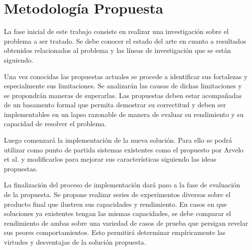 \section{Metodología Propuesta}

La fase inicial de este trabajo consiste en realizar una investigación sobre el
problema a ser tratado. Se debe conocer el estado del arte en cuanto a resultados obtenidos
relacionados al problema y las líneas de investigación que se están siguiendo.

Una vez conocidas las propuestas actuales se procede a identificar sus
fortalezas y especialmente sus limitaciones. Se analizarán las causas de
dichas limitaciones y se propondrán maneras de superarlas. Las propuestas deben
estar acompañadas de un basamento formal que permita demostrar su correctitud y
deben ser implementables en un lapso razonable de manera de evaluar su
rendimiento y su capacidad de resolver el problema.

Luego comenzará la implementación de la nueva solución. Para ello se podrá
utilizar como punto de partida sistemas existentes como el propuesto por Arvelo
et al. \cite{arvelo:aaai06} y modificarlos para mejorar
sus características siguiendo las ideas propuestas.

La finalización del proceso de implementación dará paso a la fase de evaluación de
la propuesta. Se propone realizar series de experimentos diversos sobre el
producto final que ilustren sus capacidades y rendimiento. En casos en
que soluciones ya existentes tengan las mismas capacidades, se debe comparar el
rendimiento de ambas sobre una variedad de casos de prueba que persigan revelar
sus peores comportamientos. Esto permitirá determinar empíricamente las virtudes
y desventajas de la solución propuesta.
